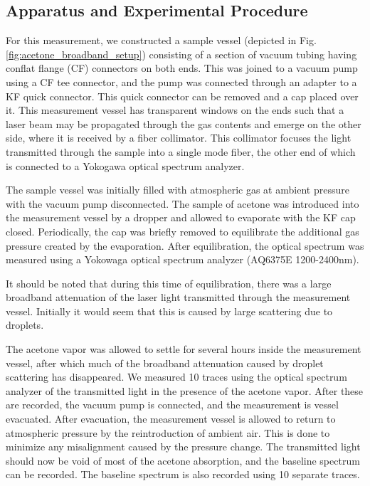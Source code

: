 \documentclass[8pt,a4paper]{report}
\begin{document}
	\subsection{Apparatus and Experimental Procedure}
	
	For this measurement, we constructed a sample vessel (depicted in Fig. \ref{fig:acetone_broadband_setup}) consisting of a section of vacuum tubing having conflat flange (CF) connectors on both ends. This was joined to a vacuum pump using a CF tee connector, and the pump was connected through an adapter to a KF quick connector. This quick connector can be removed and a cap placed over it. This measurement vessel has transparent windows on the ends such that a laser beam may be propagated through the gas contents and emerge on the other side, where it is received by a fiber collimator. This collimator focuses the light transmitted through the sample into a single mode fiber, the other end of which is connected to a Yokogawa optical spectrum analyzer.
	
	The sample vessel was initially filled with atmospheric gas at ambient pressure with the vacuum pump disconnected. The sample of acetone was introduced into the measurement vessel by a dropper and allowed to evaporate with the KF cap closed. Periodically, the cap was briefly removed to equilibrate the additional gas pressure created by the evaporation. After equilibration, the optical spectrum was measured using a Yokowaga optical spectrum analyzer (AQ6375E 1200-2400nm).
	
	It should be noted that during this time of equilibration, there was a large broadband attenuation of the laser light transmitted through the measurement vessel. Initially it would seem that this is caused by large scattering due to droplets.
	
	The acetone vapor was allowed to settle for several hours inside the measurement vessel, after which much of the broadband attenuation caused by droplet scattering has disappeared. We measured 10 traces using the optical spectrum analyzer of the transmitted light in the presence of the acetone vapor. After these are recorded, the vacuum pump is connected, and the measurement is vessel evacuated. After evacuation, the measurement vessel is allowed to return to atmospheric pressure by the reintroduction of ambient air. This is done to minimize any misalignment caused by the pressure change. The transmitted light should now be void of most of the acetone absorption, and the baseline spectrum can be recorded. The baseline spectrum is also recorded using 10 separate traces.
	
\end{document}
